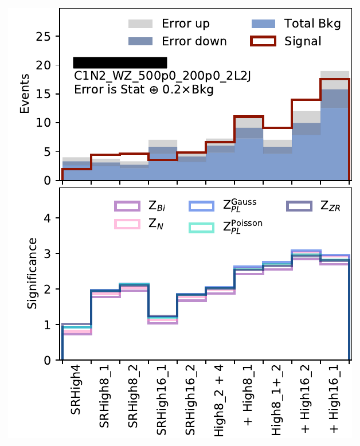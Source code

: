 \begin{figure}[tp]
\centering
\begin{subfigure}{0.495\textwidth}
\centering
\includegraphics[width=\textwidth]{figures/2ljets_disco_High_C1N2_WZ_500p0_200p0_2L2J.png}
\caption{}
\end{subfigure}
\hfill
\begin{subfigure}{0.495\textwidth}
\centering

\end{subfigure}
\end{figure}
